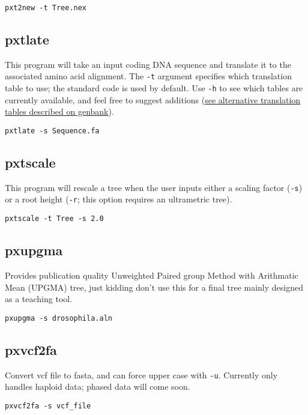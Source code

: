 \documentclass[12pt,letterpaper]{memoir}
\begin{document}
\begin{flushleft}
\begin{verbatim}
pxt2new -t Tree.nex
\end{verbatim}
\end{flushleft}

\subsection{pxtlate}

This program will take an input coding DNA sequence and translate it to the associated amino acid alignment. The \texttt{-t} argument specifies which translation table to use; the standard code is used by default. Use \texttt{-h} to see which tables are currently available, and feel free to suggest additions (\href{https://www.ncbi.nlm.nih.gov/Taxonomy/Utils/wprintgc.cgi}{see alternative translation tables described on genbank}).

\begin{flushleft}
\begin{verbatim}
pxtlate -s Sequence.fa
\end{verbatim}
\end{flushleft}

\subsection{pxtscale}

This program will rescale a tree when the user inputs either a scaling factor (\texttt{-s}) or a root height (\texttt{-r}; this option requires an ultrametric tree).

\begin{flushleft}
\begin{verbatim}
pxtscale -t Tree -s 2.0
\end{verbatim}
\end{flushleft}

\subsection{pxupgma}

Provides publication quality Unweighted Paired group Method with Arithmatic Mean (UPGMA) tree, just kidding don't use this for a final tree mainly designed as a teaching tool.

\begin{flushleft}
\begin{verbatim}
pxupgma -s drosophila.aln
\end{verbatim}
\end{flushleft}

\subsection{pxvcf2fa}
Convert vcf file to fasta, and can force upper case with \texttt{-u}.
Currently only handles haploid data; phased data will come soon.

\begin{flushleft}
\begin{verbatim}
pxvcf2fa -s vcf_file
\end{verbatim}
\end{flushleft}
\end{document}
